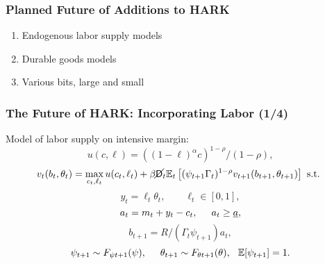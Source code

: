   \begin{frame}\label{HARKFuture}\frametitle{Planned Future of Additions to HARK}

    \begin{enumerate}
    \item Endogenous labor supply models  \hyperlink{LaborSupply}{}
    \item Durable goods models \hyperlink{DurableGoods}{}
    \item Various bits, large and small \hyperlink{StructuralChanges}{}
    \end{enumerate}
  \end{frame}


  \begin{frame}\label{LaborSupply}
    \frametitle{The Future of HARK: Incorporating Labor (1/4)}
    Model of labor supply on intensive margin:
    \begin{equation*}
      u(c,\ell) = ((1-\ell)^\alpha c)^{1-\rho}/(1-\rho),
    \end{equation*}
    \begin{equation*}
      v_t(b_t,\theta_t) = \max_{c_t, \ell_t} u(c_t,\ell_t) + \beta \cancel{\mathsf{D}}_t \mathbb{E}_t \left[(\psi_{t+1} \Gamma_t)^{1-\rho} v_{t+1}(b_{t+1},\theta_{t+1}) \right] \text{ s.t. }
    \end{equation*}
    \begin{equation*}
      y_t = \ell_t \theta_t, \qquad \ell_t \in [0,1],
    \end{equation*}
    \begin{equation*}
      a_t = m_t + y_t - c_t, \hspace{0.5cm} a_t \geq \underline{a},
    \end{equation*}
    \begin{equation*}
      b_{t+1} = R/(\Gamma_t \psi_{t+1}) a_t,
    \end{equation*}
    \begin{equation*}
      \psi_{t+1} \sim F_{\psi t+1}(\psi), \hspace{0.5cm} \theta_{t+1} \sim F_{\theta t+1}(\theta), \hspace{0.25cm} \mathbb{E}[\psi_{t+1}] = 1.
    \end{equation*}
  \end{frame}


